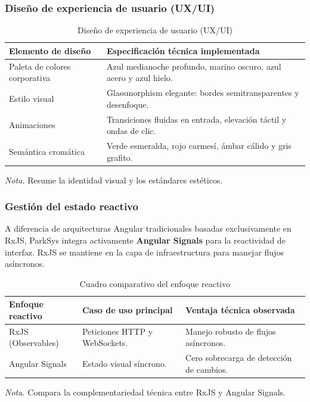 \subsubsection{Diseño de experiencia de usuario (UX/UI)}



\begin{table}[htbp]
\caption{Diseño de experiencia de usuario (UX/UI)}
\label{tab:ux_ui}
\begin{tabular}{@{}p{4cm} p{10cm}@{}}
\toprule
\textbf{Elemento de diseño} & \textbf{Especificación técnica implementada} \\
\midrule
Paleta de colores corporativa & Azul medianoche profundo, marino oscuro, azul acero y azul hielo. \\
Estilo visual & Glassmorphism elegante: bordes semitransparentes y desenfoque. \\
Animaciones & Transiciones fluidas en entrada, elevación táctil y ondas de clic. \\
Semántica cromática & Verde esmeralda, rojo carmesí, ámbar cálido y gris grafito. \\
\bottomrule
\end{tabular}
\par\vspace{0.2cm}
\textit{Nota.} Resume la identidad visual y los estándares estéticos.
\end{table}

\subsubsection{Gestión del estado reactivo}



A diferencia de arquitecturas Angular tradicionales basadas exclusivamente en RxJS, ParkSys integra activamente \textbf{Angular Signals} para la reactividad de interfaz. RxJS se mantiene en la capa de infraestructura para manejar flujos asíncronos.

\begin{table}[htbp]
\caption{Cuadro comparativo del enfoque reactivo}
\label{tab:enfoque_reactivo}
\begin{tabular}{@{}p{3cm} p{5.5cm} p{6cm}@{}}
\toprule
\textbf{Enfoque reactivo} & \textbf{Caso de uso principal} & \textbf{Ventaja técnica observada} \\
\midrule
RxJS (Observables) & Peticiones HTTP y WebSockets. & Manejo robusto de flujos asíncronos. \\
Angular Signals & Estado visual síncrono. & Cero sobrecarga de detección de cambios. \\
\bottomrule
\end{tabular}
\par\vspace{0.2cm}
\textit{Nota.} Compara la complementariedad técnica entre RxJS y Angular Signals.
\end{table}

